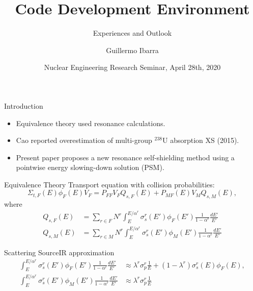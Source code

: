 \documentclass[sans,mathserif,aspectratio=169, 10pt]{beamer}
\title{Code Development Environment}
\subtitle{Experiences and Outlook}
\author[Guillermo Ibarra]{Guillermo Ibarra}
\date{Nuclear Engineering Research Seminar, April 28th, 2020}
\begin{document}
\begin{frame}
\titlepage
\end{frame}

\begin{frame}{Introduction}
\begin{itemize}
\item Equivalence theory used resonance calculations.
\item Cao reported overestimation of multi-group $^{238}$U absorption XS (2015).
\item Present paper proposes a new resonance self-shielding method using a pointwise energy slowing-down solution (PSM). 
\end{itemize}
\end{frame}

\begin{frame}{Equivalence Theory}
Transport equation with collision probabilities:
\begin{equation}
\Sigma_{t,F}(E) \phi_F (E) V_F = P_{FF} V_F Q_{s,F} (E) + P_{MF}(E)V_M Q_{s,M} (E), \label{eq:basicCP}
\end{equation}
\pause
where
\begin{align}
Q_{s,F} (E) &= \sum_{r \in F} N^r \int_E^{E/\alpha^r} \sigma_s^r (E') \phi_F (E') \frac{1}{1-\alpha^r} \frac{dE'}{E'} \\
Q_{s,M} (E) &= \sum_{r \in M} N^r \int_E^{E/\alpha^r} \sigma_s^r (E') \phi_M (E') \frac{1}{1-\alpha^r} \frac{dE'}{E'} 
\end{align}
\end{frame}

\begin{frame}{Scattering Source}{IR approximation}
\begin{align}
 \int_E^{E/\alpha^r} \sigma_s^r (E') \phi_F (E') \frac{1}{1-\alpha^r} \frac{dE'}{E'} &\approx \lambda^r \sigma_p^r \frac{1}{E} + (1-\lambda^r) \sigma_s^r (E) \phi_F (E), \\
\int_E^{E/\alpha^r} \sigma_s^r (E') \phi_M (E') \frac{1}{1-\alpha^r} \frac{dE'}{E'} &\approx \lambda^r \sigma_p^r \frac{1}{E}
\end{align}
\end{frame}
\end{document}
